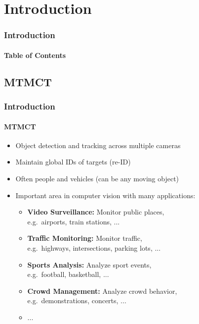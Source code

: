 \section{Introduction}
\begin{frame}
	\frametitle{Introduction}
	\framesubtitle{Table of Contents}
	{
		\hypersetup{hidelinks}
	}
\end{frame}

\subsection{MTMCT}
\begin{frame}
	\frametitle{Introduction}
	\framesubtitle{MTMCT}

	\begin{itemize}
		\item <1-> Object detection and tracking across multiple cameras
		      \vspace{5pt}
		\item <2-> Maintain global IDs of targets (re-ID)
		      \vspace{5pt}
		\item <3-> Often people and vehicles (can be any moving object)
		      \vspace{5pt}
		\item <4-> Important area in computer vision with many applications:
		      \begin{itemize}
			      \item <4-> \textbf{Video Surveillance:} Monitor public places,\\e.g.~airports, train stations, ...
			      \item <5-> \textbf{Traffic Monitoring:} Monitor traffic,\\e.g.~highways, intersections, parking lots, ...
			      \item <6-> \textbf{Sports Analysis:} Analyze sport events,\\e.g.~football, basketball, ...
			      \item <7-> \textbf{Crowd Management:} Analyze crowd behavior,\\e.g.~demonstrations, concerts, ...
			      \item <7-> ...
		      \end{itemize}
	\end{itemize}
\end{frame}

